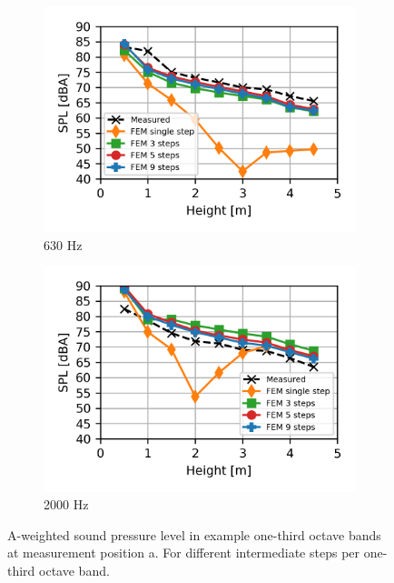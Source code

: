 \begin{figure}[H]
\begin{subfigure}[b]{0.49\textwidth}
		\includegraphics{fig/chap5/freq_steps/third_octave_over_height/630_Hz.png}
		\caption{630 Hz}
	\end{subfigure}
	\begin{subfigure}[b]{0.49\textwidth}
		\centering
		\includegraphics{fig/chap5/freq_steps/third_octave_over_height/2000_Hz.png}
		\caption{2000 Hz}
		\label{fig:curve_sink}
	\end{subfigure}
	
	\caption{A-weighted sound pressure level in example one-third octave bands at measurement position a. For different intermediate steps per one-third octave band.}
	
	\label{fig:third_octave_over_height_freq_steps}
\end{figure}

